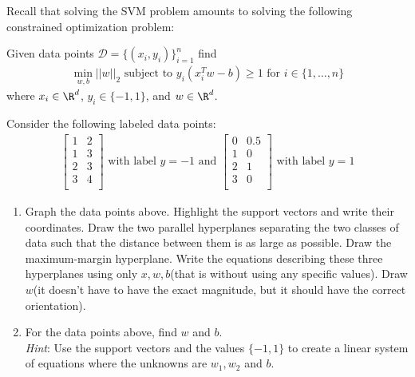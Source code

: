 \documentclass{article}
\begin{document}
\begin{aprob}
    Recall that solving the SVM problem amounts to solving the following constrained optimization problem:
    \begin{center}
        Given data points $\mathcal{D} = \{(x_i, y_i)\}^n_{i=1}$ find
        \begin{align*}
            \min_{w, b} ||w||_2 \text{ subject to } y_i(x_i^Tw - b) \geq 1 \text{ for } i \in \{1, \dots, n\}
        \end{align*}
        where $x_i \in \R^d$, $y_i \in \{-1, 1\}$, and $w \in \R^d$.
    \end{center}
    Consider the following labeled data points:
    \begin{align*}
        \begin{bmatrix}
        1 & 2 \\
        1 & 3 \\
        2 & 3 \\
        3 & 4 \\
        \end{bmatrix} \text{ with label } y=-1 \text{ and } \begin{bmatrix}
        0 & 0.5 \\
        1 & 0 \\
        2 & 1 \\
        3 & 0 \\
        \end{bmatrix} \text{ with label } y=1
    \end{align*}
    \begin{enumerate}
        \item {} Graph the data points above. Highlight the support vectors and write their coordinates. Draw the two parallel hyperplanes separating the two classes of data such that the distance between them is as large as possible. Draw the maximum-margin hyperplane. Write the equations describing these three hyperplanes using only $x, w, b$(that is without using any specific values). Draw $w$(it doesn't have to have the exact magnitude, but it should have the correct orientation).
        
        \item {} For the data points above, find $w$ and $b$. \\
        
        \textit{Hint}: Use the support vectors and the values $\{-1, 1\}$ to create a linear system of equations where the unknowns are $w_1, w_2$ and $b$.
        

\end{enumerate}
\end{aprob}
\end{document}

